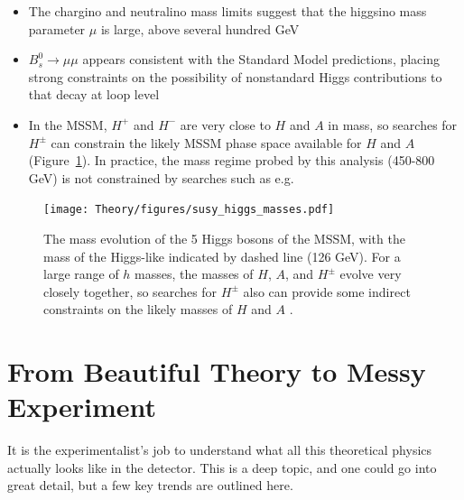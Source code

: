 \begin{itemize}
    \item The chargino and neutralino mass limits suggest that the higgsino mass
parameter $\mu$ is large, above several hundred GeV
    \item $B_s^0\rightarrow\mu\mu$ appears consistent with the Standard Model predictions,
placing strong constraints on the possibility of nonstandard Higgs contributions
to that decay at loop level \cite{bs_to_mumu}
    \item In the MSSM, $H^+$ and $H^-$ are very close to $H$ and $A$ in mass, so searches
for $H^\pm$ can constrain the likely MSSM phase space available for $H$ and $A$ (Figure~\ref{fig:susy_higgs_masses}).
    In practice, the mass regime probed by this analysis (450-800 GeV) is not
    constrained by searches such as e.g.~\cite{charged_higgs_search}
\end{itemize}


\begin{figure}
	\centering
	\texttt{[image: Theory/figures/susy\_higgs\_masses.pdf]}
	\caption{The mass evolution of the 5 Higgs bosons of the MSSM, with the 
    mass of the Higgs-like indicated by dashed line (126 GeV).  For a large
    range of $h$ masses, the masses of $H$, $A$, and $H^\pm$ evolve very closely
    together, so searches for $H^\pm$ also can provide some indirect constraints
    on the likely masses of $H$ and $A$ \cite{ellis}. 
    \label{fig:susy_higgs_masses}}
\end{figure}
 


\section{From Beautiful Theory to Messy Experiment}

It is the experimentalist's job to understand what all this theoretical physics actually 
looks like in the detector.  This is a deep topic, and one could 
go into great detail, but a few key trends are outlined here.

